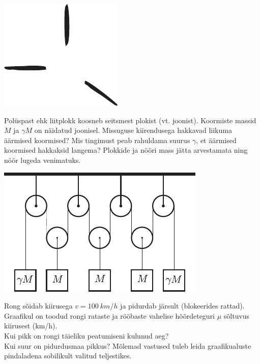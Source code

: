 \documentclass[10pt, twoside]{article}
\begin{document}
{\begin{center}
	\includegraphics[width=0.6\linewidth]{2008-v2g-06-yl}
\end{center}
\probend
\bigskip


Polüspast ehk liitplokk koosneb seitsmest plokist (vt. joonist). Koormiste massid $M$ ja $\gamma M$ on näidatud joonisel. Missuguse kiirendusega hakkavad liikuma äärmised koormised? Mis tingimust peab rahuldama suurus $\gamma$, et äärmised koormised hakkaksid langema? Plokkide ja nööri mass jätta arvestamata ning nöör lugeda venimatuks. 

\begin{center}
	\includegraphics[width=0.6\linewidth]{2008-v2g-09-yl}
\end{center}
\probend
\bigskip


Rong sõidab kiirusega $v = \SI{100}{km/h}$ ja pidurdab järsult (blokeerides rattad). Graafikul on toodud rongi rataste ja rööbaste vahelise hõõrdeteguri $\mu$ sõltuvus kiirusest (\si{km/h}).\\
\osa Kui pikk on rongi täieliku peatumiseni kulunud aeg?\\
\osa Kui suur on pidurdusmaa pikkus? Mõlemad vastused tuleb leida
graafikualuste pindaladena sobilikult valitud teljestikes.

}
\end{document}
